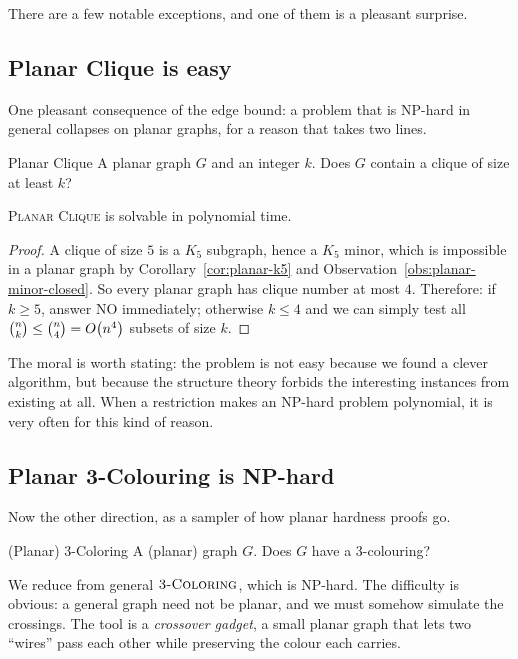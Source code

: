 There are a few notable exceptions, and one of them is a pleasant surprise.

\subsection{Planar Clique is easy}

One pleasant consequence of the edge bound: a problem that is
\textrm{NP}-hard in general collapses on planar graphs, for a reason that takes
two lines.

\begin{probdef}{Planar Clique}
  \instance A planar graph $G$ and an integer $k$.
  \question Does $G$ contain a clique of size at least $k$?
\end{probdef}

\begin{proposition}
\textsc{Planar Clique} is solvable in polynomial time.
\end{proposition}

\begin{proof}
A clique of size $5$ is a $K_5$ subgraph, hence a $K_5$ minor, which is
impossible in a planar graph by Corollary~\ref{cor:planar-k5} and
Observation~\ref{obs:planar-minor-closed}. So every planar graph has clique number at
most $4$. Therefore: if $k \ge 5$, answer NO immediately; otherwise
$k \le 4$ and we can simply test all $\binom{n}{k} \le \binom{n}{4} =
O\!\left(n^4\right)$ subsets of size $k$.
\end{proof}

The moral is worth stating: the problem is not easy because we found a clever
algorithm, but because the structure theory forbids the interesting instances
from existing at all. When a restriction makes an NP-hard problem polynomial,
it is very often for this kind of reason.

\subsection{Planar 3-Colouring is NP-hard}\label{sec:planar-3col}

Now the other direction, as a sampler of how planar hardness proofs go.

\begin{probdef}{(Planar) 3-Coloring}
  \instance A (planar) graph $G$.
  \question Does $G$ have a $3$-colouring?
\end{probdef}

We reduce from general $\textsc{3-Coloring}$, which is NP-hard. The difficulty is
obvious: a general graph need not be planar, and we must somehow simulate the
crossings. The tool is a \emph{crossover gadget}, a small planar graph that
lets two ``wires'' pass each other while preserving the colour each carries.

